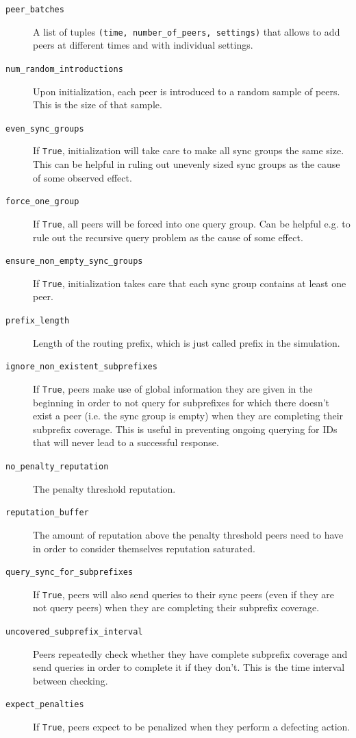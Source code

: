 \begin{description}
\item[\texttt{peer\_batches}] A list of tuples \texttt{(time, number\_of\_peers,
settings)} that allows to add peers at different times and with individual
settings.
\item[\texttt{num\_random\_introductions}] Upon initialization, each peer is
introduced to a random sample of peers. This is the size of that sample.
\item[\texttt{even\_sync\_groups}] If \texttt{True}, initialization will take
care to make all sync groups the same size. This can be helpful in ruling out
unevenly sized sync groups as the cause of some observed effect.
\item[\texttt{force\_one\_group}] If \texttt{True}, all peers will be forced
into one query group. Can be helpful e.g. to rule out the recursive query
problem as the cause of some effect.
\item[\texttt{ensure\_non\_empty\_sync\_groups}] If \texttt{True},
initialization takes care that each sync group contains at least one peer.
\item[\texttt{prefix\_length}] Length of the routing prefix, which is just
called prefix in the simulation.
\item[\texttt{ignore\_non\_existent\_subprefixes}] If \texttt{True}, peers make
use of global information they are given in the beginning in order to not query
for subprefixes for which there doesn't exist a peer (i.e. the sync group is
empty) when they are completing their subprefix coverage. This is useful in
preventing ongoing querying for IDs that will never lead to a successful
response.
\item[\texttt{no\_penalty\_reputation}] The penalty threshold reputation.
\item[\texttt{reputation\_buffer}] The amount of reputation above the penalty
threshold peers need to have in order to consider themselves reputation
saturated.
\item[\texttt{query\_sync\_for\_subprefixes}] If \texttt{True}, peers will also
send queries to their sync peers (even if they are not query peers) when they
are completing their subprefix coverage.
\item[\texttt{uncovered\_subprefix\_interval}] Peers repeatedly check whether
they have complete subprefix coverage and send queries in order to complete it
if they don't. This is the time interval between checking.
\item[\texttt{expect\_penalties}] If \texttt{True}, peers expect to be penalized
when they perform a defecting action.
\end{description}


